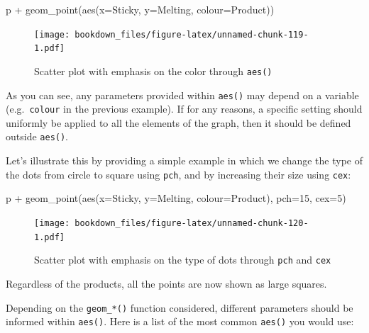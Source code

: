 \documentclass[
]{krantz}
\makeatletter
\newenvironment{Shaded}{\begin{snugshade}}{\end{snugshade}}
\newcommand{\AttributeTok}[1]{\textcolor[rgb]{0.61,0.61,0.61}{#1}}
\newcommand{\DecValTok}[1]{\textcolor[rgb]{0.06,0.06,0.06}{#1}}
\newcommand{\FunctionTok}[1]{\textcolor[rgb]{0,0,0}{#1}}
\newcommand{\NormalTok}[1]{#1}
\newcommand{\SpecialCharTok}[1]{\textcolor[rgb]{0,0,0}{#1}}
\newenvironment{kframe}{%
\medskip{}
\setlength{\fboxsep}{.8em}
 \def\at@end@of@kframe{}%
 \ifinner\ifhmode%
  \def\at@end@of@kframe{\end{minipage}}%
  \begin{minipage}{\columnwidth}%
 \fi\fi%
 \def\FrameCommand##1{\hskip\@totalleftmargin \hskip-\fboxsep
 \colorbox{shadecolor}{##1}\hskip-\fboxsep
     \hskip-\linewidth \hskip-\@totalleftmargin \hskip\columnwidth}%
 \MakeFramed {\advance\hsize-\width
   \@totalleftmargin\z@ \linewidth\hsize
   \@setminipage}}%
 {\par\unskip\endMakeFramed%
 \at@end@of@kframe}
\renewenvironment{Shaded}{\begin{kframe}}{\end{kframe}}
\makeatother
\begin{document}
\begin{Shaded}
\begin{Highlighting}[]
\NormalTok{p }\SpecialCharTok{+} \FunctionTok{geom\_point}\NormalTok{(}\FunctionTok{aes}\NormalTok{(}\AttributeTok{x=}\NormalTok{Sticky, }\AttributeTok{y=}\NormalTok{Melting, }\AttributeTok{colour=}\NormalTok{Product))}
\end{Highlighting}
\end{Shaded}

\begin{figure}
\centering
\texttt{[image: bookdown\_files/figure-latex/unnamed-chunk-119-1.pdf]}
\caption{\label{fig:unnamed-chunk-119}Scatter plot with emphasis on the color through \texttt{aes()}}
\end{figure}

As you can see, any parameters provided within \texttt{aes()} may depend on a variable (e.g.~\texttt{colour} in the previous example).
If for any reasons, a specific setting should uniformly be applied to all the elements of the graph, then it should be defined outside \texttt{aes()}.

Let's illustrate this by providing a simple example in which we change the type of the dots from circle to square using \texttt{pch}, and by increasing their size using \texttt{cex}:

\begin{Shaded}
\begin{Highlighting}[]
\NormalTok{p }\SpecialCharTok{+} \FunctionTok{geom\_point}\NormalTok{(}\FunctionTok{aes}\NormalTok{(}\AttributeTok{x=}\NormalTok{Sticky, }\AttributeTok{y=}\NormalTok{Melting, }\AttributeTok{colour=}\NormalTok{Product), }\AttributeTok{pch=}\DecValTok{15}\NormalTok{, }\AttributeTok{cex=}\DecValTok{5}\NormalTok{)}
\end{Highlighting}
\end{Shaded}

\begin{figure}
\centering
\texttt{[image: bookdown\_files/figure-latex/unnamed-chunk-120-1.pdf]}
\caption{\label{fig:unnamed-chunk-120}Scatter plot with emphasis on the type of dots through \texttt{pch} and \texttt{cex}}
\end{figure}

Regardless of the products, all the points are now shown as large squares.

Depending on the \texttt{geom\_*()} function considered, different parameters should be informed within \texttt{aes()}. Here is a list of the most common \texttt{aes()} you would use:
\end{document}
